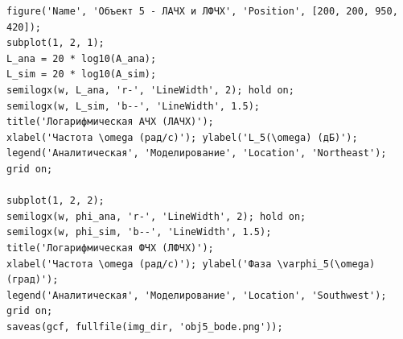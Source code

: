 \documentclass[12pt, a4paper]{article}
\begin{document}
\begin{lstlisting}[caption={Скрипт MATLAB для исследования Объекта 5}]
% 5. ЛАЧХ и ЛФЧХ
figure('Name', 'Объект 5 - ЛАЧХ и ЛФЧХ', 'Position', [200, 200, 950, 420]);
subplot(1, 2, 1);
L_ana = 20 * log10(A_ana);
L_sim = 20 * log10(A_sim);
semilogx(w, L_ana, 'r-', 'LineWidth', 2); hold on;
semilogx(w, L_sim, 'b--', 'LineWidth', 1.5);
title('Логарифмическая АЧХ (ЛАЧХ)');
xlabel('Частота \omega (рад/с)'); ylabel('L_5(\omega) (дБ)');
legend('Аналитическая', 'Моделирование', 'Location', 'Northeast'); grid on;

subplot(1, 2, 2);
semilogx(w, phi_ana, 'r-', 'LineWidth', 2); hold on;
semilogx(w, phi_sim, 'b--', 'LineWidth', 1.5);
title('Логарифмическая ФЧХ (ЛФЧХ)');
xlabel('Частота \omega (рад/с)'); ylabel('Фаза \varphi_5(\omega) (град)');
legend('Аналитическая', 'Моделирование', 'Location', 'Southwest'); grid on;
saveas(gcf, fullfile(img_dir, 'obj5_bode.png'));
\end{lstlisting}
\end{document}
